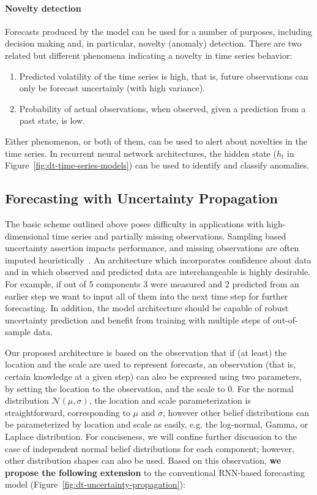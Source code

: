 \documentclass[runningheads]{llncs}
\begin{document}
\paragraph{Novelty detection} Forecasts produced by the model
can be used for a number of purposes, including decision making
and, in particular, novelty (anomaly) detection. There are two
related but different phenomena indicating a novelty
in time series behavior:
\begin{enumerate}
\item Predicted volatility of the time series is high, that is, future
observations can only be forecast uncertainly (with high variance). 
\item Probability of actual observations, when observed, given a prediction
from a past state, is low.
\end{enumerate}
Either phenomenon, or both of them, can be used to alert about
novelties in the time series. In recurrent neural network
architectures, the hidden state ($h_t$ in
Figure~\ref{fig:dt-time-series-models}) can be used to identify
and classify anomalies.

\subsection{Forecasting with Uncertainty Propagation}

The basic scheme outlined above poses difficulty in
applications with high-dimensional time series and partially
missing observations. Sampling based uncertainty assertion
impacts performance, and missing observations are often imputed
heuristically~\cite{LKW16,SYG+19}. An architecture which
incorporates confidence about data and in which observed and
predicted data are interchangeable is  highly desirable. For
example, if out of 5 components 3 were measured and 2 predicted
from an earlier step we want to input all of them into the next
time step for further forecasting. In addition, the model
architecture should be capable of robust uncertainty prediction
and benefit from training with multiple steps of out-of-sample
data.

Our proposed architecture is based on the observation that if
(at least) the location and the scale are used  to represent
forecasts, an observation (that is, certain knowledge at a given
step) can also be expressed using two parameters, by setting the
location to the observation, and the scale to 0. For the normal
distribution $\mathcal{N}(\mu, \sigma)$, the location and scale
parameterization is straightforward, corresponding to $\mu$ and
$\sigma$, however other belief distributions can be parameterized
by location and scale as easily, e.g. the log-normal,
Gamma, or Laplace distribution. For conciseness, we will confine
further discussion to the case of independent normal belief
distributions for each component; however, other distribution
shapes can also be used. Based on this observation,
\textbf{we propose the following
extension} to the conventional RNN-based forecasting model
(Figure~\ref{fig:dt-uncertainty-propagation}):
\end{document}
